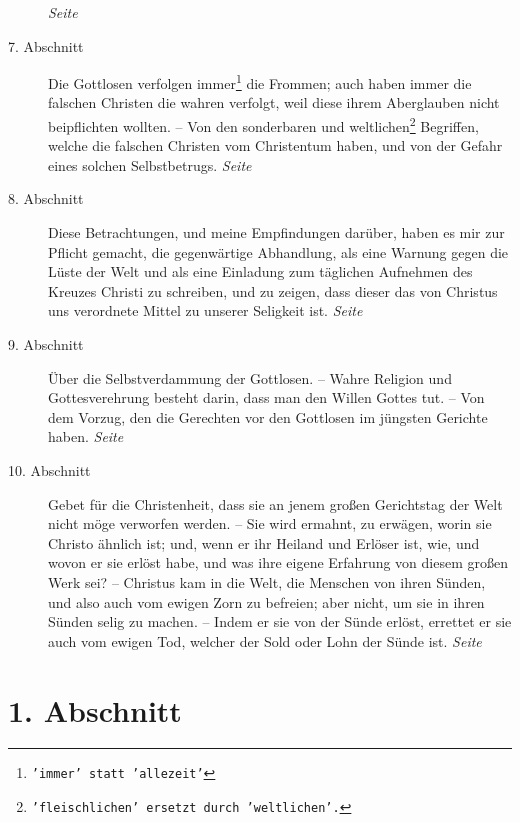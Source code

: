 \begin{description}
\dotfill \textit{Seite~\pageref{kap1_ab6}}\\
\item[7. Abschnitt] Die Gottlosen verfolgen immer\footnote{\texttt{'immer' statt
'allezeit'}} die Frommen; auch haben immer die falschen Christen die wahren
verfolgt, weil diese ihrem Aberglauben nicht beipflichten wollten. -- Von den
sonderbaren und weltlichen\footnote{\texttt{'fleischlichen' ersetzt durch 'weltlichen'.}}
Begriffen, welche die falschen Christen vom
Christentum haben, und von der Gefahr eines solchen Selbstbetrugs.
\dotfill \textit{Seite~\pageref{kap1_ab7}}\\
\item[8. Abschnitt] Diese Betrachtungen, und meine Empfindungen darüber, haben
es mir zur Pflicht gemacht, die gegenwärtige Abhandlung, als eine Warnung gegen
die Lüste der Welt und als eine Einladung zum täglichen Aufnehmen des Kreuzes
Christi zu schreiben, und zu zeigen, dass dieser das von Christus uns verordnete
Mittel zu unserer Seligkeit ist.
\dotfill \textit{Seite~\pageref{kap1_ab8}}\\
\item[9. Abschnitt] Über die Selbstverdammung der Gottlosen. -- Wahre Religion
und Gottesverehrung  besteht darin, dass man den
Willen Gottes tut. -- Von dem
Vorzug, den die Gerechten vor den Gottlosen im jüngsten Gerichte haben.
\dotfill \textit{Seite~\pageref{kap1_ab9}}\\
\item[10. Abschnitt] Gebet für die Christenheit, dass sie an jenem großen
Gerichtstag der Welt nicht möge verworfen werden. -- Sie wird ermahnt, zu
erwägen, worin sie Christo ähnlich ist; und, wenn er ihr Heiland und Erlöser
ist, wie, und wovon er sie erlöst habe, und was ihre eigene Erfahrung von diesem
großen Werk sei? -- Christus kam in die Welt, die Menschen von ihren Sünden, und
also auch vom ewigen Zorn zu befreien; aber nicht, um sie in ihren Sünden selig
zu machen. -- Indem er sie von der Sünde erlöst, errettet er sie auch vom ewigen
Tod, welcher der Sold oder Lohn der Sünde ist.
\dotfill \textit{Seite~\pageref{kap1_ab10}}\\
\end{description}

\newpage

\section{1. Abschnitt} \label{kap1_ab1}

